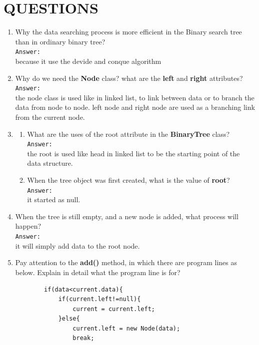 \documentclass[12pt,titlepage]{article}
\begin{document}
\section{QUESTIONS}
\begin{enumerate}
    \item Why the data searching process is more efficient in the Binary search tree than in ordinary binary tree?
    \mbox{}\\ \texttt{Answer:} \mbox{}\\
    because it use the devide and conque algorithm
    \item Why do we need the \textbf{Node} class? what are the \textbf{left} and \textbf{right} attributes?
    \mbox{}\\ \texttt{Answer:} \mbox{}\\
    the node class is used like in linked list, to link between data or to branch the data from node to node. left node and right node are used as a branching link from the current node.
    \item \begin{enumerate}[label=\alph*.]
        \item What are the uses of the root attribute in the \textbf{BinaryTree} class?
        \mbox{}\\ \texttt{Answer:} \mbox{}\\
        the root is used like head in linked list to be the starting point of the data structure.
        \item When the tree object was first created, what is the value of \textbf{root}?
        \mbox{}\\ \texttt{Answer:} \mbox{}\\
        it started as null.
    \end{enumerate}
    \item When the tree is still empty, and a new node is added, what process will happen?
    \mbox{}\\ \texttt{Answer:} \mbox{}\\
    it will simply add data to the root node.
    \item Pay attention to the \textbf{add()} method, in which there are program lines as below. Explain in detail what the program line is for?
    \begin{verbatim}    
        if(data<current.data){
            if(current.left!=null){
                current = current.left;
            }else{
                current.left = new Node(data);
                break;

\end{verbatim}
\end{enumerate}
\end{document}
